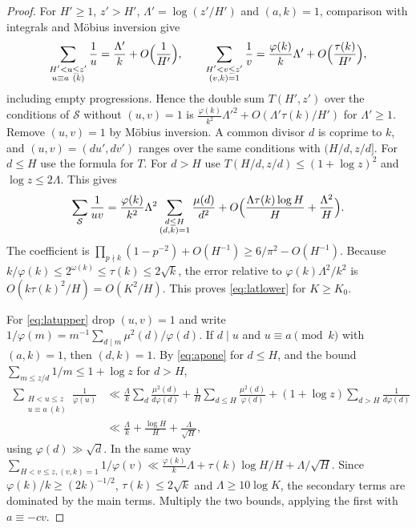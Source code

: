 \documentclass[10pt,reqno]{amsart}
\theoremstyle{remark}
\newcommand{\Sset}{\mathcal S}
\begin{document}
\begin{proof}
For $H'\geq1$, $z'>H'$, $\Lambda'=\log(z'/H')$ and $(a,k)=1$, comparison
with integrals and M\"obius inversion give
\begin{equation}\label{eq:apone}
 \sum_{\substack{H'<u\leq z'\\u\equiv a\ (k)}}\frac1u
 =\frac{\Lambda'}k+O\Bigl(\frac1{H'}\Bigr),\qquad
 \sum_{\substack{H'<v\leq z'\\(v,k)=1}}\frac1v
 =\frac{\varphi(k)}k\Lambda'+O\Bigl(\frac{\tau(k)}{H'}\Bigr),
\end{equation}
including empty progressions.  Hence the double sum $T(H',z')$ over the
conditions of $\Sset$ without $(u,v)=1$ is
$\frac{\varphi(k)}{k^2}\Lambda'^2+O(\Lambda'\tau(k)/H')$ for
$\Lambda'\geq1$.  Remove $(u,v)=1$ by M\"obius inversion.  A common divisor
$d$ is coprime to $k$, and $(u,v)=(du',dv')$ ranges over the same
conditions with $(H/d,z/d]$.  For $d\leq H$ use the formula for $T$.  For
$d>H$ use $T(H/d,z/d)\leq(1+\log z)^2$ and $\log z\leq2\Lambda$.  This
gives
\[
 \sum_{\Sset}\frac1{uv}=\frac{\varphi(k)}{k^2}\Lambda^2
 \sum_{\substack{d\leq H\\(d,k)=1}}\frac{\mu(d)}{d^2}
 +O\Bigl(\frac{\Lambda\tau(k)\log H}{H}+\frac{\Lambda^2}{H}\Bigr).
\]
The coefficient is $\prod_{p\nmid k}(1-p^{-2})+O(H^{-1})\geq6/\pi^2-O(H^{-1})$.
Because $k/\varphi(k)\leq2^{\omega(k)}\leq\tau(k)\leq2\sqrt k$, the error
relative to $\varphi(k)\Lambda^2/k^2$ is $O(k\tau(k)^2/H)=O(K^2/H)$.  This
proves \eqref{eq:latlower} for $K\geq K_0$.

For \eqref{eq:latupper} drop $(u,v)=1$ and write
$1/\varphi(m)=m^{-1}\sum_{d\mid m}\mu^2(d)/\varphi(d)$.  If $d\mid u$ and
$u\equiv a\pmod k$ with $(a,k)=1$, then $(d,k)=1$.  By \eqref{eq:apone} for
$d\leq H$, and the bound $\sum_{m\leq z/d}1/m\leq1+\log z$ for $d>H$,
\[
 \begin{aligned}
 \sum_{\substack{H<u\leq z\\u\equiv a\ (k)}}\frac1{\varphi(u)}
 &\ll\frac\Lambda k\sum_d\frac{\mu^2(d)}{d\varphi(d)}
 +\frac1H\sum_{d\leq H}\frac{\mu^2(d)}{\varphi(d)}
 +(1+\log z)\sum_{d>H}\frac1{d\varphi(d)}\\
 &\ll\frac\Lambda k+\frac{\log H}H+\frac{\Lambda}{\sqrt H},
 \end{aligned}
\]
using $\varphi(d)\gg\sqrt d$.  In the same way
$\sum_{H<v\leq z,(v,k)=1}1/\varphi(v)\ll\frac{\varphi(k)}k\Lambda
+\tau(k)\log H/H+\Lambda/\sqrt H$.  Since $\varphi(k)/k\geq(2k)^{-1/2}$,
$\tau(k)\leq2\sqrt k$ and $\Lambda\geq10\log K$, the secondary terms are
dominated by the main terms.  Multiply the two bounds, applying the first
with $a\equiv-cv$.
\end{proof}
\end{document}
